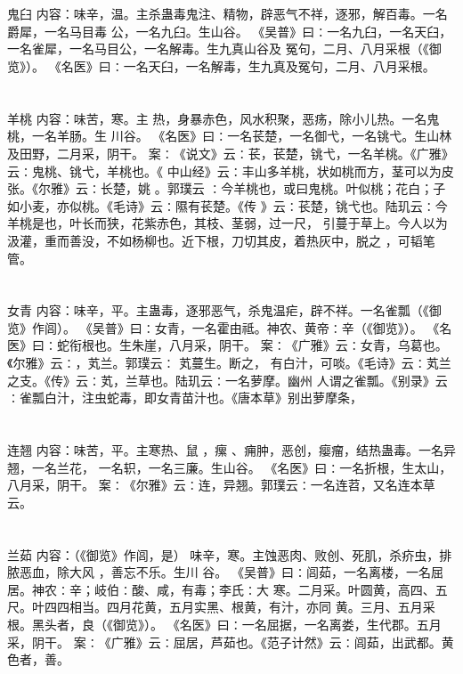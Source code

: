 \documentclass[12pt,UTF8]{ctexbook}
\begin{document}
\section{}鬼臼
内容：味辛，温。主杀蛊毒鬼注、精物，辟恶气不祥，逐邪，解百毒。一名爵犀，一名马目毒 
公，一名九臼。生山谷。 
《吴普》曰∶一名九臼，一名天臼，一名雀犀，一名马目公，一名解毒。生九真山谷及 
冤句，二月、八月采根（《御览》）。 
《名医》曰∶一名天臼，一名解毒，生九真及冤句，二月、八月采根。 


\section{}羊桃
内容：味苦，寒。主 热，身暴赤色，风水积聚，恶疡，除小儿热。一名鬼桃，一名羊肠。生 
川谷。 
《名医》曰∶一名苌楚，一名御弋，一名铫弋。生山林及田野，二月采，阴干。 
案∶《说文》云∶苌，苌楚，铫弋，一名羊桃。《广雅》云∶鬼桃、铫弋，羊桃也。《 
中山经》云∶丰山多羊桃，状如桃而方，茎可以为皮张。《尔雅》云∶长楚，姚 。郭璞云 
∶今羊桃也，或曰鬼桃。叶似桃；花白；子如小麦，亦似桃。《毛诗》云∶隰有苌楚。《传 
》云∶苌楚，铫弋也。陆玑云∶今羊桃是也，叶长而狭，花紫赤色，其枝、茎弱，过一尺， 
引蔓于草上。今人以为汲灌，重而善没，不如杨柳也。近下根，刀切其皮，着热灰中，脱之 
，可韬笔管。 


\section{}女青
内容：味辛，平。主蛊毒，逐邪恶气，杀鬼温疟，辟不祥。一名雀瓢（《御览》作闾）。 
《吴普》曰∶女青，一名霍由祗。神农、黄帝∶辛（《御览》）。 
《名医》曰∶蛇衔根也。生朱崖，八月采，阴干。 
案∶《广雅》云∶女青，乌葛也。《尔雅》云∶，芄兰。郭璞云∶ 芄蔓生。断之， 
有白汁，可啖。《毛诗》云∶芄兰之支。《传》云∶芄，兰草也。陆玑云∶一名萝摩。幽州 
人谓之雀瓢。《别录》云∶雀瓢白汁，注虫蛇毒，即女青苗汁也。《唐本草》别出萝摩条， 


\section{}连翘
内容：味苦，平。主寒热、鼠 ，瘰 、痈肿，恶创，瘿瘤，结热蛊毒。一名异翘，一名兰花， 
一名轵，一名三廉。生山谷。 
《名医》曰∶一名折根，生太山，八月采，阴干。 
案∶《尔雅》云∶连，异翘。郭璞云∶一名连苕，又名连本草云。 


\section{}兰茹
内容：（《御览》作闾，是） 
味辛，寒。主蚀恶肉、败创、死肌，杀疥虫，排脓恶血，除大风 
，善忘不乐。生川 
谷。 
《吴普》曰∶闾茹，一名离楼，一名屈居。神农∶辛；岐伯∶酸、咸，有毒；李氏∶大 
寒。二月采。叶圆黄，高四、五尺。叶四四相当。四月花黄，五月实黑、根黄，有汁，亦同 
黄。三月、五月采根。黑头者，良（《御览》）。 
《名医》曰∶一名屈据，一名离娄，生代郡。五月采，阴干。 
案∶《广雅》云∶屈居，芦茹也。《范子计然》云∶闾茹，出武都。黄色者，善。 
\end{document}
